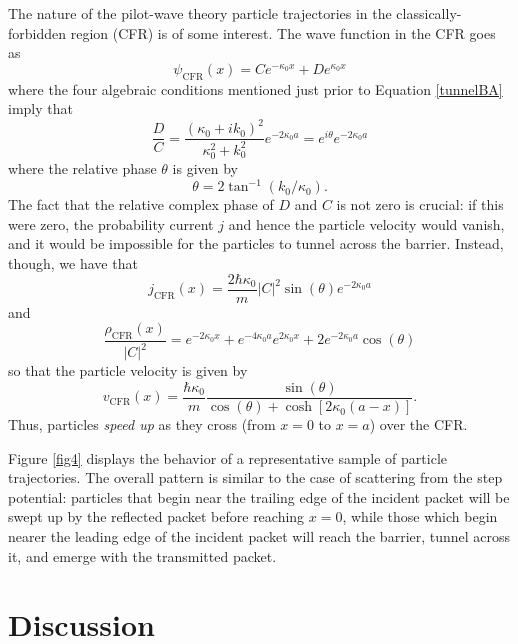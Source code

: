 \documentclass[aps,prc,twocolumn,letterpaper,floatfix]{revtex4}
\begin{document}
The nature of the pilot-wave theory particle 
trajectories in the classically-forbidden region 
(CFR) is of some interest.  The wave function in the
CFR goes as
\begin{equation}
\psi_{\text{CFR}}(x) = C e^{-\kappa_0 x} + D e^{\kappa_0 x}
\end{equation}
where the four algebraic conditions mentioned
just prior to Equation \eqref{tunnelBA} imply that 
\begin{equation}
\frac{D}{C} = \frac{(\kappa_0 + i k_0)^2}{\kappa_0^2 + k_0^2} e^{-2
  \kappa_0 a} = e^{i \theta} e^{-2 \kappa_0 a}
\end{equation}
where the relative phase $\theta$ is given by
\begin{equation}
\theta = 2 \tan^{-1}(k_0/\kappa_0).
\end{equation}
The fact that the relative complex phase of $D$ and $C$ is not zero is
crucial:  if this were zero, the probability current $j$ and hence the
particle velocity would vanish, and it would be impossible for the
particles to tunnel across the barrier.  Instead, though, we have that
\begin{equation}
j_{\text{CFR}}(x) = \frac{2 \hbar \kappa_0}{m} |C|^2 \sin(\theta)
e^{-2 \kappa_0 a}
\end{equation}
and
\begin{equation}
\frac{\rho_{\text{CFR}}(x)}{|C|^2} =  e^{-2 \kappa_0 x} + e^{-4 \kappa_0 a} e^{2 \kappa_0 x} + 2 e^{-2 \kappa_0 a} \cos(\theta) 
\end{equation}
so that the particle velocity is given by
\begin{equation}
v_{\text{CFR}}(x) = \frac{\hbar \kappa_0}{m} \frac{ \sin(\theta)
}{\cos(\theta) + \cosh\left[ 2 \kappa_0 (a-x)\right]}.
\end{equation}
Thus, particles \emph{speed up} as they cross (from $x=0$ to $x=a$)
over the CFR.  

Figure \ref{fig4} displays the behavior of a representative 
sample of particle trajectories.  The overall pattern is similar to
the case of scattering from the step potential:  particles that begin
near the trailing edge of the incident packet will be swept up by the
reflected packet before reaching $x=0$, while those which begin nearer
the leading edge of the incident packet will reach the barrier, tunnel
across it, and emerge with the transmitted packet.  


\section{Discussion}
\end{document}
